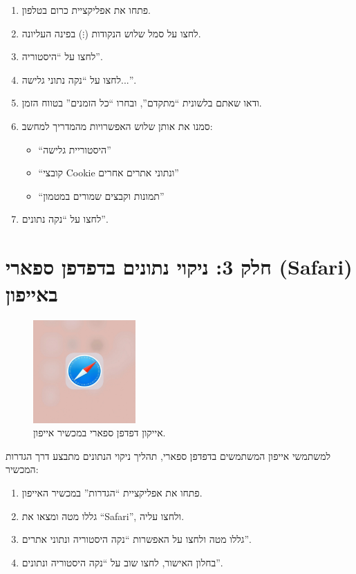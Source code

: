 \documentclass[12pt]{article}
\begin{document}
\begin{enumerate}
    \item פתחו את אפליקציית כרום בטלפון.
    \item לחצו על סמל שלוש הנקודות (\(\vdots\)) בפינה העליונה.
    \item לחצו על \enquote{היסטוריה}.
    \item לחצו על \enquote{נקה נתוני גלישה...}.
    \item ודאו שאתם בלשונית \enquote{מתקדם}, ובחרו \enquote{כל הזמנים} בטווח הזמן.
    \item סמנו את אותן שלוש האפשרויות מהמדריך למחשב:
    \begin{itemize}
        \item \enquote{היסטוריית גלישה}
        \item \enquote{קובצי Cookie ונתוני אתרים אחרים}
        \item \enquote{תמונות וקבצים שמורים במטמון}
    \end{itemize}
    \item לחצו על \enquote{נקה נתונים}.
\end{enumerate}

\section*{חלק 3: ניקוי נתונים בדפדפן ספארי (Safari) באייפון}

\begin{figure}[H]
  \centering
  \includegraphics[width=0.35\textwidth]{files/safari_iphone_icon.png}
  \caption{אייקון דפדפן ספארי במכשיר אייפון.}
\end{figure}

למשתמשי אייפון המשתמשים בדפדפן ספארי, תהליך ניקוי הנתונים מתבצע דרך הגדרות המכשיר:

\begin{enumerate}
    \item פתחו את אפליקציית \enquote{הגדרות} במכשיר האייפון.
    \item גללו מטה ומצאו את \enquote{Safari}, ולחצו עליה.
    \item גללו מטה ולחצו על האפשרות \enquote{נקה היסטוריה ונתוני אתרים}.
    \item בחלון האישור, לחצו שוב על \enquote{נקה היסטוריה ונתונים}.
\end{enumerate}
\end{document}
